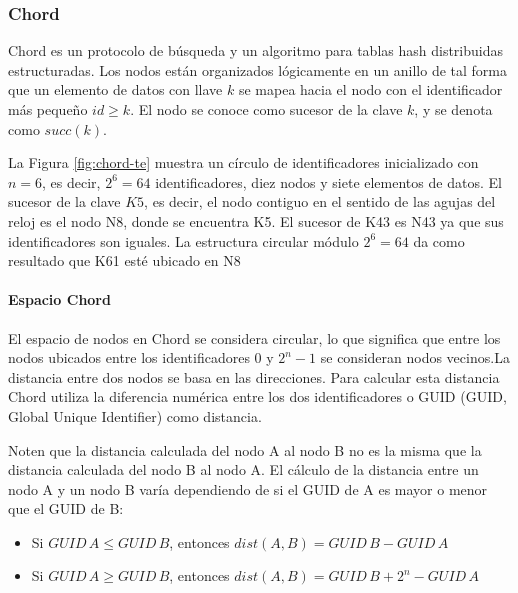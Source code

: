  
 
 
 
 \subsubsection{Chord}
 
 Chord  \cite{Stoica2001}  \cite{Goetz2005} \cite{Wehrle2005a} es un protocolo de búsqueda y un algoritmo para tablas hash distribuidas estructuradas.  Los nodos están organizados lógicamente  en un anillo de tal forma que un elemento de datos con llave $k$ se mapea hacia el nodo con  el identificador más pequeño $id \geq k$. El nodo se conoce como sucesor de la clave $k$, y se denota  como $succ(k)$.
 
 La Figura   \ref{fig:chord-te} muestra un círculo de identificadores inicializado con $n = 6$, es decir, $2^{6} = 64$ identificadores, diez nodos y siete elementos de datos. El sucesor de la clave $K5$, es decir,
 el nodo contiguo en el sentido de las agujas del reloj es el nodo N8, donde se encuentra K5. El sucesor de K43 es N43 ya que sus identificadores son iguales. La estructura circular módulo $2^{6} = 64$  da como resultado que K61 esté ubicado en N8
 
  
 \paragraph{Espacio Chord}
 El espacio de nodos en Chord se considera circular, lo que significa que entre los nodos ubicados entre los identificadores  $0$ y $2^n-1$ se consideran nodos vecinos.La distancia entre dos nodos se basa en las direcciones. Para calcular esta distancia  Chord utiliza la diferencia numérica entre los dos identificadores o  GUID  (GUID, Global Unique Identifier) como distancia. 

 Noten que la  distancia calculada del nodo A al nodo B no es la misma que la distancia calculada del nodo B al nodo A. El cálculo de la distancia entre un nodo A y un nodo B varía dependiendo de si el GUID de A es mayor o menor que el GUID de B:
 
 \begin{itemize}
 	\item  Si \quad $GUID  \,  A  \leq GUID \,   B$, entonces $dist(A, B) = GUID \,  B - GUID \,  A$
 	
 	\item Si \quad $GUID \,  A  \geq GUID \,  B$, entonces $dist(A, B) = GUID \,  B + 2^n - GUID \, A $
 \end{itemize}
 

